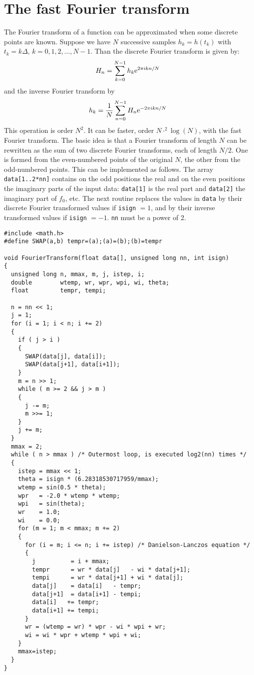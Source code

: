 \documentclass[a4paper,fancyheadings,twoside]{report}
\begin{document}
\section{The fast Fourier transform}
The Fourier transform of a function can be approximated when some discrete
points are known. Suppose we have $N$ successive samples $h_k=h(t_k)$ with
$t_k=k\Delta$, $k=0,1,2,...,N-1$. Than the discrete Fourier transform is
given by:
\[
H_n=\sum_{k=0}^{N-1}h_k{\rm e}^{2\pi ikn/N}
\]
and the inverse Fourier transform by
\[
h_k=\frac{1}{N}\sum_{n=0}^{N-1}H_n{\rm e}^{-2\pi ikn/N}
\]
This operation is order $N^2$. It can be faster, order $N\cdot ^2\log(N)$,
with the fast Fourier transform. The basic idea is that a Fourier transform
of length $N$ can be rewritten as the sum of two discrete Fourier transforms,
each of length $N/2$. One is formed from the even-numbered points of
the original $N$, the other from the odd-numbered points.
\npar
This can be implemented as follows.
The array {\tt data[1..2*nn]} contains on the odd positions the real and on the
even positions the imaginary parts of the input data: {\tt data[1]}
is the real part and {\tt data[2]} the imaginary part of $f_0$, etc. The
next routine replaces the values in {\tt data} by their discrete Fourier
transformed values if {\tt isign} $=1$, and by their inverse transformed values
if {\tt isign} $=-1$. {\tt nn} must be a power of 2.
\begin{verbatim}
#include <math.h>
#define SWAP(a,b) tempr=(a);(a)=(b);(b)=tempr

void FourierTransform(float data[], unsigned long nn, int isign)
{
  unsigned long n, mmax, m, j, istep, i;
  double        wtemp, wr, wpr, wpi, wi, theta;
  float         tempr, tempi;

  n = nn << 1;
  j = 1;
  for (i = 1; i < n; i += 2)
  {
    if ( j > i )
    {
      SWAP(data[j], data[i]);
      SWAP(data[j+1], data[i+1]);
    }
    m = n >> 1;
    while ( m >= 2 && j > m )
    {
      j -= m;
      m >>= 1;
    }
    j += m;
  }
  mmax = 2;
  while ( n > mmax ) /* Outermost loop, is executed log2(nn) times */
  {
    istep = mmax << 1;
    theta = isign * (6.28318530717959/mmax);
    wtemp = sin(0.5 * theta);
    wpr   = -2.0 * wtemp * wtemp;
    wpi   = sin(theta);
    wr    = 1.0;
    wi    = 0.0;
    for (m = 1; m < mmax; m += 2)
    {
      for (i = m; i <= n; i += istep) /* Danielson-Lanczos equation */
      {
        j          = i + mmax;
        tempr      = wr * data[j]   - wi * data[j+1];
        tempi      = wr * data[j+1] + wi * data[j];
        data[j]    = data[i]   - tempr;
        data[j+1]  = data[i+1] - tempi;
        data[i]   += tempr;
        data[i+1] += tempi;
      }
      wr = (wtemp = wr) * wpr - wi * wpi + wr;
      wi = wi * wpr + wtemp * wpi + wi;
    }
    mmax=istep;
  }
}
\end{verbatim}
\end{document}
